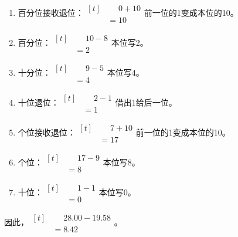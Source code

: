 {\begin{enumerate}[leftmargin=1.7em,itemsep=5pt,topsep=0pt]
\item 百分位接收退位：\(\begin{aligned}[t]&\phantom{={}}0+10\\&=10\end{aligned}\)\quad 前一位的1变成本位的10。
\item 百分位：\(\begin{aligned}[t]&\phantom{={}}10-8\\&=2\end{aligned}\)\quad 本位写2。
\item 十分位：\(\begin{aligned}[t]&\phantom{={}}9-5\\&=4\end{aligned}\)\quad 本位写4。
\item 十位退位：\(\begin{aligned}[t]&\phantom{={}}2-1\\&=1\end{aligned}\)\quad 借出1给后一位。
\item 个位接收退位：\(\begin{aligned}[t]&\phantom{={}}7+10\\&=17\end{aligned}\)\quad 前一位的1变成本位的10。
\item 个位：\(\begin{aligned}[t]&\phantom{={}}17-9\\&=8\end{aligned}\)\quad 本位写8。
\item 十位：\(\begin{aligned}[t]&\phantom{={}}1-1\\&=0\end{aligned}\)\quad 本位写0。
\end{enumerate}
\par\smallskip
因此，\(\begin{aligned}[t]&\phantom{={}}28.00-19.58\\&=8.42\end{aligned}\)。
\par\medskip

}


\par



